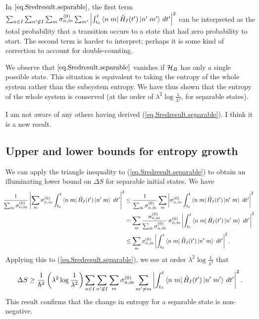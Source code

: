 In \(\ref{eq.Sredresult.separable}\), the first term \(\sum_{n\in I}\sum_{n^\prime \not\in I}\sum_m \sigma_{n,m}^{(0)} \sum_{m^\prime} \left|\int_{t_0}^t \left\langle n\;m\right|\hat{H}_I (t^{\prime})\left|n^\prime\;m^\prime\right\rangle \,dt^{\prime}\right|^2\) can be interpreted as the total probability that a transition occurs to a state that had zero probability to start. The second term is harder to interpret; perhaps it is some kind of correction to account for double-counting.

We observe that \(\ref{eq.Sredresult.separable}\) vanishes if \(\mathcal{H}_B\) has only a single possible state. This situation is equivalent to taking the entropy of the whole system rather than the subsystem entropy. We have thus shown that the entropy of the whole system is conserved (at the order of \(\lambda^2 \log\frac{1}{\lambda^2}\), for separable states).

I am not aware of any others having derived (\ref{eq.Sredresult.separable}). I think it is a new result.


\subsection{Upper and lower bounds for entropy growth}

We can apply the triangle inequality to (\ref{eq.Sredresult.separable}) to obtain an illuminating lower bound on \(\Delta S\) for separable initial states. We have
\begin{align*}
\hspace{-0.4em}\frac{1}{\sum_m \sigma_{n,m}^{(0)}} \left|\sum_m{\sigma_{n,m}^{(0)}}\int_{t_0}^t \left\langle n\;m\right| \hat{H}_I(t^\prime) 
 \left|n^\prime\;m\right\rangle\;dt^\prime \right|^2
& \leq \frac{1}{\sum_{\tilde{m}} \sigma_{n,\tilde{m}}^{(0)}} \sum_{m} \left|{\sigma_{n,m}^{(0)}}\int_{t_0}^t \left\langle n\;m\right| \hat{H}_I(t^\prime) 
 \left|n^\prime\;m\right\rangle\;dt^\prime \right|^2 \\
 &= \sum_m \frac{\sigma_{n,m}^{(0)}}{\sum_{\tilde{m}} \sigma_{n,\tilde{m}}^{(0)}} \;\sigma_{n,m}^{(0)} \left|\int_{t_0}^t \left\langle n\;m\right| \hat{H}_I(t^\prime) 
 \left|n^\prime\;m\right\rangle\;dt^\prime \right|^2 \\
 &\leq \sum_m \sigma_{n,m}^{(0)} \left|\int_{t_0}^t \left\langle n\;m\right| \hat{H}_I(t^\prime) 
 \left|n^\prime\;m\right\rangle\;dt^\prime \right|^2.
\end{align*}
Applying this to (\ref{eq.Sredresult.separable}), we see at order \(\lambda^2 \log \frac{1}{\lambda^2}\) that
\[
\Delta S \geq \frac{1}{\hbar^2}\left(\lambda^2 \log\frac{1}{\lambda^2}\right) \sum_{n\in I}\sum_{n^\prime \not\in I} \sum_m \sigma_{n,m}^{(0)} \sum_{m^\prime \neq m} \left|\int_{t_0}^t \left\langle n\;m\right|\hat{H}_I (t^{\prime})\left|n^\prime\;m^\prime\right\rangle \,dt^{\prime}\right|^2.
\]
This result confirms that the change in entropy for a separable state is non-negative.

